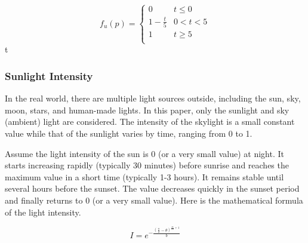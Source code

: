 \documentclass{article}
\begin{document}
\[
  f_{u}(p)=
  \left\{
    \begin{array}{ll}
      0 & t\leq 0 \\
      1 - \frac{t}{5} &  0 < t < 5 \\
      1 & t\geq 5 \\
    \end{array} 
  \right. 
\]
 t 



\subsubsection {Sunlight Intensity}
In the real world, there are multiple light sources outside, including the sun, sky, moon, stars, 
and human-made lights. In this paper, only the sunlight and sky (ambient) light are considered. 
The intensity of the skylight is a small constant value while that of the sunlight varies by 
time, ranging from 0 to 1.

Assume the light intensity of the sun is 0 (or a very small value) at night. It starts increasing 
rapidly (typically 30 minutes) before sunrise and reaches the maximum value in a short time 
(typically 1-3 hours). It remains stable until several hours before the sunset. The value 
decreases quickly in the sunset period and finally returns to 0 (or a very small value). Here is 
the mathematical formula of the light intensity.

\[
  I = e^{-\frac{\left(\frac{\pi}{2} - \theta\right)^{\frac{m}{60} + 1}}{b}}
\]
\end{document}
